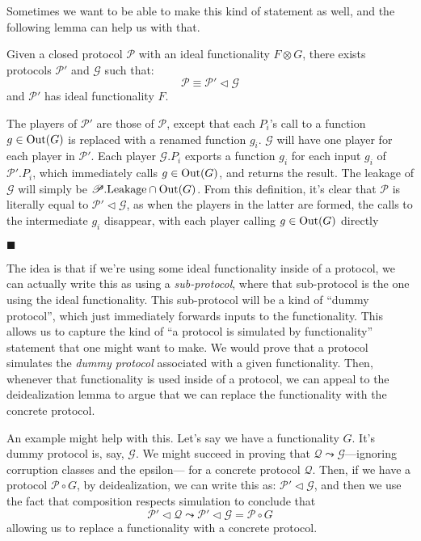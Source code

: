 Sometimes we want to be able to make this kind of statement as well,
and the following lemma can help us with that.

\begin{lemma}
  Given a closed protocol $\mathscr{P}$ with an ideal functionality $F \otimes G$,
  there exists protocols $\mathscr{P}'$ and $\mathscr{G}$
  such that:
  $$
  \mathscr{P} \equiv \mathscr{P}' \lhd \mathscr{G}
  $$
  and $\mathscr{P}'$ has ideal functionality $F$.


   The players of $\mathscr{P}'$ are those of $\mathscr{P}$,
  except that each $P_i$'s call to a function $g \in \text{Out}(G)$ is replaced with
  a renamed function $g_i$.
  $\mathscr{G}$ will have one player for each player in $\mathscr{P}'$.
  Each player $\mathscr{G}.P_i$ exports a function $g_i$ for each input
  $g_i$ of $\mathscr{P}'.P_i$, which immediately calls $g \in \text{Out}(G)$,
  and returns the result.
  The leakage of $\mathscr{G}$ will simply be $\mathscr{P}.\text{Leakage} \cap \text{Out}(G)$.
  From this definition, it's clear that $\mathscr{P}$ is literally equal
  to $\mathscr{P}' \lhd \mathscr{G}$, as when the players in the latter
  are formed, the calls to the intermediate $g_i$ disappear,
  with each player calling $g \in \text{Out}(G)$ directly

  $\blacksquare$
\end{lemma}

The idea is that if we're using some ideal functionality inside
of a protocol, we can actually write this as using
a \emph{sub-protocol}, where that sub-protocol is the one using
the ideal functionality.
This sub-protocol will be a kind of ``dummy protocol'',
which just immediately forwards inputs to the functionality.
This allows us to capture the kind of ``a protocol is simulated by functionality''
statement that one might want to make.
We would prove that a protocol simulates the \emph{dummy protocol}
associated with a given functionality.
Then, whenever that functionality is used inside of a protocol,
we can appeal to the deidealization lemma to argue that we can
replace the functionality with the concrete protocol.

An example might help with this.
Let's say we have a functionality $G$.
It's dummy protocol is, say, $\mathscr{G}$.
We might succeed in proving that
$\mathscr{Q} \leadsto \mathscr{G}$---ignoring corruption classes and the epsilon---
for a concrete protocol $\mathscr{Q}$.
Then, if we have a protocol $\mathscr{P} \circ G$,
by deidealization, we can write this as:
$\mathscr{P}' \lhd \mathscr{G}$, and then we use the fact that composition
respects simulation to conclude that
$$
\mathscr{P}' \lhd \mathscr{Q} \leadsto 
\mathscr{P}' \lhd \mathscr{G} = \mathscr{P} \circ G
$$
allowing us to replace a functionality with a concrete protocol.

